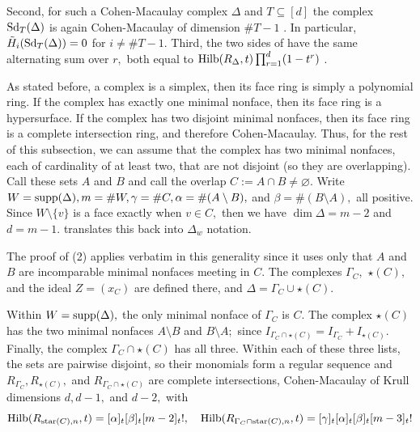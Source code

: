 Second, for such a Cohen-Macaulay complex $\Delta$ and $T\subseteq[d]$ the complex $\operatorname{Sd}_T(\Delta)$ is again Cohen-Macaulay of dimension $\# T - 1$ \cite{munkres,stanley-balanced}. In particular, $\Tilde{H}_i(\operatorname{Sd}_T(\Delta)) = 0$ for $i\neq\# T - 1.$ Third, the two sides of  have the same alternating sum over $r,$ both equal to $\mathrm{Hilb}(R_\Delta,t)\prod_{r=1}^d(1-t^r)$ \cite[Prop~2.5,~Eq.~30]{adams-reiner}.

As stated before, a complex is a simplex, then its face ring is simply a polynomial ring. If the complex has exactly one minimal nonface, then its face ring is a hypersurface. If the complex has two disjoint minimal nonfaces, then its face ring is a complete intersection ring, and therefore Cohen-Macaulay. Thus, for the rest of this subsection, we can assume that the complex has two minimal nonfaces, each of cardinality of at least two, that are not disjoint (so they are overlapping). Call these sets $A$ and $B$ and call the overlap $C := A\cap B\neq\varnothing.$ Write $W = \mathrm{supp}(\Delta), m = \#W, \gamma = \#C, \alpha = \#(A\setminus B),$ and $\beta = \#(B\setminus A),$ all positive. Since $W\setminus\{v\}$ is a face exactly when $v\in C,$ then we have $\dim\Delta = m - 2$ and $d = m - 1.$  translates this back into $\Delta_w$ notation.

The proof of (2) applies verbatim in this generality since it uses only that $A$ and $B$ are incomparable minimal nonfaces meeting in $C.$ 
The complexes $\Gamma_C,$ $\star(C),$ and the ideal $Z = (x_C)$ are defined there, and $\Delta = \Gamma_C\cup\star(C).$


Within $W = \mathrm{supp}(\Delta),$ the only minimal nonface of $\Gamma_C$ is $C.$
The complex $\star(C)$ has the two minimal nonfaces $A\setminus B$ and $B\setminus A;$ since $I_{\Gamma_{C}\cap\star(C)} = I_{\Gamma_C}+I_{\star(C)}.$ Finally, the complex $\Gamma_C\cap\star(C)$ has all three. 
Within each of these three lists, the sets are pairwise disjoint, so their monomials form a regular sequence and $R_{\Gamma_C}, R_{\star(C)},$ and $R_{\Gamma_C\cap\star(C)}$ are complete intersections, Cohen-Macaulay of Krull dimensions $d,d-1,$ and $d - 2,$ with
\begin{equation}
\label{eq: hilb of star and C intersect star}
    \mathrm{Hilb}(R_{\mathrm{star}(C),n}, t) = [\alpha]_t[\beta]_t[m-2]_t!,
    \quad
    \mathrm{Hilb}(R_{\Gamma_C\cap\mathrm{star}(C),n}, t) = [\gamma]_t[\alpha]_t[\beta]_t[m-3]_t!
\end{equation}

